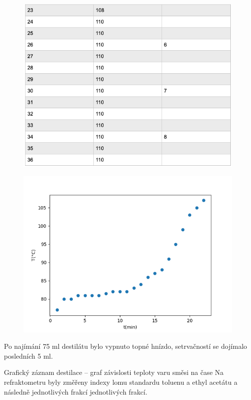 \documentclass[13pt, a4paper, twoside]{article}
\begin{document}
\begin{figure}[H]
    \centering
    \includegraphics[width=6.5in]{uloha_8_tab_2.png}
\end{figure}

\begin{figure}[H]
    \centering
    \includegraphics[width=6in]{teplota_cas.png}
\end{figure}

Po najímání 75 ml destilátu bylo vypnuto topné hnízdo, setrvačností se dojímalo posledních 5 ml.

Grafický záznam destilace – graf závislosti teploty varu směsi na čase
Na refraktometru byly změřeny indexy lomu standardu toluenu a ethyl acetátu a následně jednotlivých frakcí jednotlivých frakcí.
\end{document}
